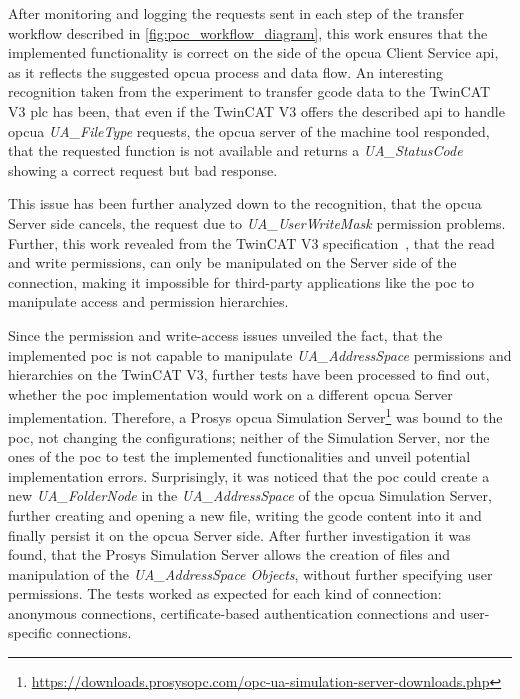 \documentclass[
a4paper,
twoside,
headsepline,
cleardoublepage=empty,
parskip=half,
draft=false
]{scrbook}
\begin{document}
				After monitoring and logging the requests sent in each step of the transfer workflow described in \cref{fig:poc_workflow_diagram}, this work ensures that the implemented functionality is correct on the side of the \gls{opcua} Client Service \gls{api}, as it reflects the suggested \gls{opcua} process and data flow. An interesting recognition taken from the experiment to transfer \gls{gcode} data to the TwinCAT V3 \gls{plc} has been, that even if the TwinCAT V3 offers the described \gls{api} to handle \gls{opcua} \textit{UA\_FileType} requests, the \gls{opcua} server of the machine tool responded, that the requested function is not available and returns a \textit{UA\_StatusCode} showing a correct request but bad response.
				
				This issue has been further analyzed down to the recognition, that the \gls{opcua} Server side cancels, the request due to \textit{UA\_UserWriteMask} permission problems. Further, this work revealed from the TwinCAT V3 specification~\cite{twincat2018}, that the read and write permissions, can only be manipulated on the Server side of the connection, making it impossible for third-party applications like the \gls{poc} to manipulate access and permission hierarchies. 
				
				Since the permission and write-access issues unveiled the fact, that the implemented \gls{poc} is not capable to manipulate \textit{UA\_AddressSpace} permissions and hierarchies on the TwinCAT V3, further tests have been processed to find out, whether the \gls{poc} implementation would work on a different \gls{opcua} Server implementation.
				Therefore, a Prosys \gls{opcua} Simulation Server\footnote{\url{https://downloads.prosysopc.com/opc-ua-simulation-server-downloads.php}} was bound to the \gls{poc}, not changing the configurations; neither of the Simulation Server, nor the ones of the \gls{poc} to test the implemented functionalities and unveil potential implementation errors. 
				Surprisingly, it was noticed that the \gls{poc} could create a new \textit{UA\_FolderNode} in the \textit{UA\_AddressSpace} of the \gls{opcua} Simulation Server, further creating and opening a new file, writing the \gls{gcode} content into it and finally persist it on the \gls{opcua} Server side. After further investigation it was found, that the Prosys Simulation Server allows the creation of files and manipulation of the \textit{UA\_AddressSpace Objects}, without further specifying user permissions. The tests worked as expected for each kind of connection: anonymous connections, certificate-based authentication connections and user-specific connections.
				
\end{document}
